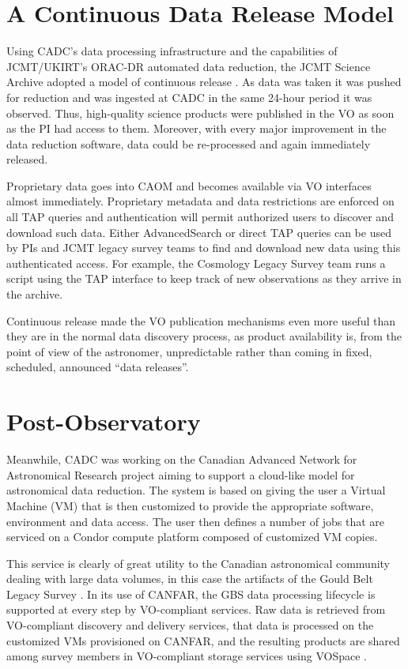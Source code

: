 \documentclass[final,authoryear,5p,times,twocolumn]{elsarticle}
\begin{document}
\section{A Continuous Data Release Model}

Using CADC's data processing infrastructure and the capabilities of
JCMT/UKIRT's ORAC-DR automated data reduction, the JCMT Science
Archive adopted a model of continuous release
\citep{2011ASPC..442..203E}. As data was taken it was pushed for
reduction and was ingested at CADC in the same 24-hour period it was
observed. Thus, high-quality science products were published in the VO
as soon as the PI had access to them. Moreover, with every major
improvement in the data reduction software, data could be re-processed
and again immediately released.

Proprietary data goes into CAOM and becomes available via VO
interfaces almost immediately. Proprietary metadata and data
restrictions are enforced on all TAP queries and authentication will
permit authorized users to discover and download such data. Either
AdvancedSearch or direct TAP queries can be used by PIs and JCMT
legacy survey teams to find and download new data using this
authenticated access. For example, the Cosmology Legacy Survey team
\citep{2013MNRAS.432...53G} runs a script using the TAP interface to
keep track of new observations as they arrive in the archive.

Continuous release made the VO publication mechanisms even more useful
than they are in the normal data discovery process, as product
availability is, from the point of view of the astronomer,
unpredictable rather than coming in fixed, scheduled, announced ``data
releases''.

\section{Post-Observatory}

Meanwhile, CADC was working on the Canadian Advanced Network for
Astronomical Research \citep[CANFAR;][]{2010SPIE.7740E..51G,2015ACCADC} project aiming to
support a cloud-like model for astronomical data reduction. The system
is based on giving the user a Virtual Machine (VM) that is then customized to
provide the appropriate software, environment and data access. The
user then defines a number of jobs that are serviced on a Condor
compute platform composed of customized VM copies.

This service is clearly of great utility to the Canadian astronomical
community dealing with large data volumes, in this case the artifacts of
the Gould Belt Legacy Survey \citep[GBS;][]{2007PASP..119..855W}.
In its use of CANFAR, the GBS data
processing lifecycle is supported at every step by VO-compliant services.
Raw data is retrieved from VO-compliant discovery and delivery services,
that data is processed on the customized VMs provisioned on CANFAR, and
the resulting products are shared among survey members in VO-compliant
storage services using VOSpace \citep{vospace}.
\end{document}
